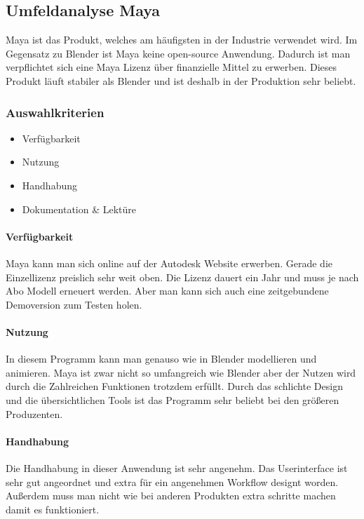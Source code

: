 \pagebreak

\subsection{Umfeldanalyse Maya}
Maya ist das Produkt, welches am häufigsten in der Industrie verwendet wird. Im Gegensatz zu Blender ist Maya keine open-source Anwendung. Dadurch ist man verpflichtet sich eine Maya Lizenz über finanzielle Mittel zu erwerben. Dieses Produkt läuft stabiler als Blender und ist deshalb in der Produktion sehr beliebt.

\subsubsection{Auswahlkriterien}
\begin{itemize}
    \item Verfügbarkeit
    \item Nutzung
    \item Handhabung
    \item Dokumentation \& Lektüre
\end{itemize}

\paragraph{Verfügbarkeit}
Maya kann man sich online auf der Autodesk Website erwerben. Gerade die Einzellizenz preislich sehr weit oben. Die Lizenz dauert ein Jahr und muss je nach Abo Modell erneuert werden. Aber man kann sich auch eine zeitgebundene Demoversion zum Testen holen.

\paragraph{Nutzung}
In diesem Programm kann man genauso wie in Blender modellieren und animieren. Maya ist zwar nicht so umfangreich wie Blender aber der Nutzen wird durch die Zahlreichen Funktionen trotzdem erfüllt. Durch das schlichte Design und die übersichtlichen Tools ist das Programm sehr beliebt bei den größeren Produzenten.

\paragraph{Handhabung}
Die Handhabung in dieser Anwendung ist sehr angenehm. Das Userinterface ist sehr gut angeordnet und extra für ein angenehmen Workflow designt worden. Außerdem muss man nicht wie bei anderen Produkten extra schritte machen damit es funktioniert.

